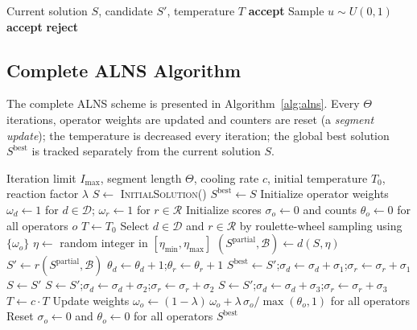 \documentclass[11pt]{article}
\begin{document}
\begin{algorithm}[H]
\caption{Simulated Annealing Acceptance}
\label{alg:accept}
\begin{algorithmic}[1]
\REQUIRE Current solution $S$, candidate $S'$, temperature $T$
    \RETURN \textbf{accept}
\ELSE
    \STATE Sample $u \sim U(0,1)$
        \RETURN \textbf{accept}
    \ELSE
        \RETURN \textbf{reject}
    \ENDIF
\ENDIF
\end{algorithmic}
\end{algorithm}

\subsection{Complete ALNS Algorithm}

The complete ALNS scheme is presented in Algorithm~\ref{alg:alns}. Every $\Theta$ iterations, operator weights are updated and counters are reset (a \emph{segment update}); the temperature is decreased every iteration; the global best solution $S^{\mathrm{best}}$ is tracked separately from the current solution $S$.

\begin{algorithm}[H]
\caption{Adaptive Large Neighborhood Search for HFVRPTW}
\label{alg:alns}
\begin{algorithmic}[1]
\REQUIRE Iteration limit $I_{\max}$, segment length $\Theta$, cooling rate $c$, initial temperature $T_0$, reaction factor $\lambda$
\STATE $S \gets$ \textsc{InitialSolution}() 
\STATE $S^{\mathrm{best}} \gets S$
\STATE Initialize operator weights $\omega_d \gets 1$ for $d \in \mathcal{D}$; $\omega_r \gets 1$ for $r \in \mathcal{R}$
\STATE Initialize scores $\sigma_o \gets 0$ and counts $\theta_o \gets 0$ for all operators $o$
\STATE $T \gets T_0$
    \STATE Select $d \in \mathcal{D}$ and $r \in \mathcal{R}$ by roulette-wheel sampling using $\{\omega_o\}$
    \STATE $\eta \gets$ random integer in $[\eta_{\min}, \eta_{\max}]$
    \STATE $(S^{\mathrm{partial}}, \mathcal{B}) \gets d(S, \eta)$ 
    \STATE $S' \gets r(S^{\mathrm{partial}}, \mathcal{B})$ 
    \STATE $\theta_d \gets \theta_d + 1$;\quad $\theta_r \gets \theta_r + 1$
        \STATE $S^{\mathrm{best}} \gets S'$;\quad $\sigma_d \gets \sigma_d + \sigma_1$;\quad $\sigma_r \gets \sigma_r + \sigma_1$
        \STATE $S \gets S'$
        \STATE $S \gets S'$;\quad $\sigma_d \gets \sigma_d + \sigma_2$;\quad $\sigma_r \gets \sigma_r + \sigma_2$
        \STATE $S \gets S'$;\quad $\sigma_d \gets \sigma_d + \sigma_3$;\quad $\sigma_r \gets \sigma_r + \sigma_3$
    \ENDIF
    \STATE $T \gets c \cdot T$
        \STATE Update weights $\omega_o \gets (1-\lambda)\,\omega_o + \lambda\,\sigma_o / \max(\theta_o, 1)$ for all operators
        \STATE Reset $\sigma_o \gets 0$ and $\theta_o \gets 0$ for all operators
    \ENDIF
\ENDFOR
\RETURN $S^{\mathrm{best}}$
\end{algorithmic}
\end{algorithm}
\end{document}
